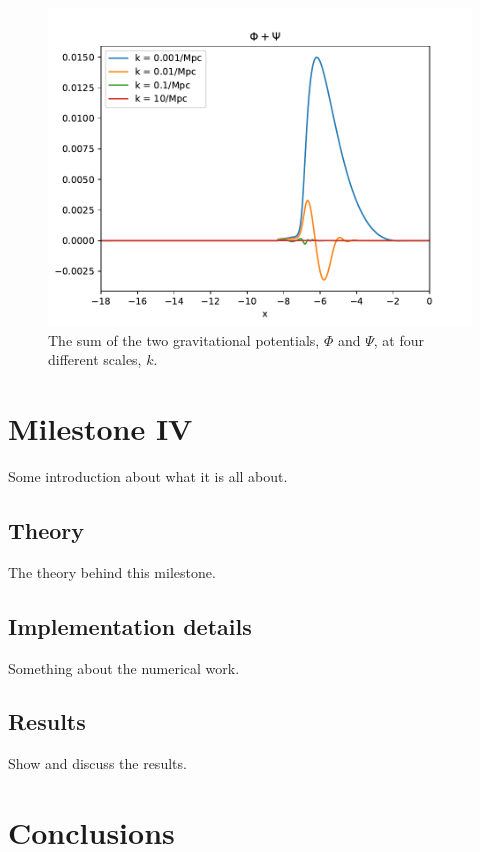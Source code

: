 \documentclass{aa}
\begin{document}
\begin{figure}[H]
   \includegraphics[scale=0.6]{../figures/milestone3/phi_psi.pdf}
   \caption{The sum of the two gravitational potentials, $\Phi$ and $\Psi$, at four different scales, $k$.}\label{fig:phi_psi}
\end{figure}



\section{Milestone IV}
Some introduction about what it is all about.

\subsection{Theory}
The theory behind this milestone.

\subsection{Implementation details}
Something about the numerical work.

\subsection{Results}
Show and discuss the results.

\section{Conclusions}
\end{document}
